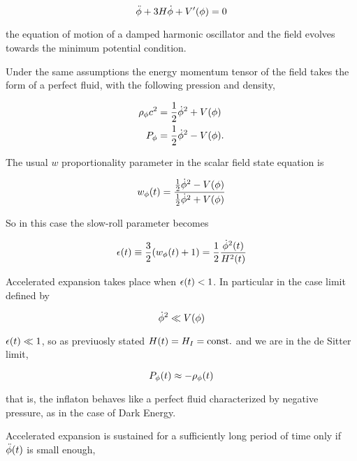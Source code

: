 \begin{equation}
        \ddot \phi + 3H \dot\phi + V'\qty(\phi) = 0
\end{equation}

the equation of motion of a damped harmonic oscillator and the field
evolves towards the minimum potential condition.

Under the same assumptions the energy momentum tensor of the field takes
the form of a perfect fluid, with the following pression and density,

\begin{align}
        \rho_\phi c^2 & = \frac{1}{2} \dot\phi^2 + V\qty(\phi) \\
        P_\phi & = \frac{1}{2}\dot\phi^2 - V\qty(\phi).
\end{align}

The usual $w$ proportionality parameter in the scalar field state equation
is

\begin{equation}
        w_\phi\qty(t) = \frac{\frac{1}{2} \dot\phi^2 - V\qty(\phi)}{\frac{1}{2}
        \dot\phi^2 + V\qty(\phi)}
\end{equation}

So in this case the slow-roll parameter becomes

\begin{equation}
        \epsilon\qty(t) \equiv \frac{3}{2} \qty(w_\phi\qty(t) + 1) =
        \frac{1}{2} \frac{\dot\phi^2\qty(t)}{H^2\qty(t)}
\end{equation}

Accelerated expansion takes place when $\epsilon\qty(t) < 1$. In particular
in the case limit defined by

\begin{equation}
        \dot\phi^2 \ll V\qty(\phi)
        \label{eq:sr_condition_1}
\end{equation}

$\epsilon\qty(t) \ll 1$, so as previuosly stated $H\qty(t) = H_I =
\text{const.}$ and we are in the de Sitter limit,

\begin{equation}
        P_\phi\qty(t) \approx -\rho_\phi\qty(t)
\end{equation}

that is, the inflaton behaves like a perfect fluid characterized by
negative pressure, as in the case of Dark Energy.

Accelerated expansion is sustained for a sufficiently long period of time
only if $\ddot \phi\qty(t)$ is small enough,

